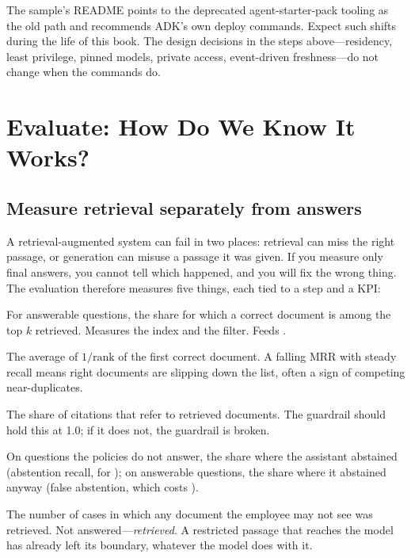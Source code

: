 \begin{designnote}
The sample's README points to the deprecated agent-starter-pack tooling as the old path and recommends ADK's own deploy commands. Expect such shifts during the life of this book. The design decisions in the steps above---residency, least privilege, pinned models, private access, event-driven freshness---do not change when the commands do.
\end{designnote}

\section{Evaluate: How Do We Know It Works?}
\label{sec:policy-evaluate}

\subsection{Measure retrieval separately from answers}

A retrieval-augmented system can fail in two places: retrieval can miss the right passage, or generation can misuse a passage it was given. If you measure only final answers, you cannot tell which happened, and you will fix the wrong thing. The evaluation therefore measures five things, each tied to a step and a KPI:
\begin{description}[leftmargin=1em,itemsep=2pt]
  \item[Recall@$k$] For answerable questions, the share for which a correct document is among the top $k$ retrieved. Measures the index and the filter. Feeds .
  \item[Mean reciprocal rank (MRR)] The average of $1/\text{rank}$ of the first correct document. A falling MRR with steady recall means right documents are slipping down the list, often a sign of competing near-duplicates.
  \item[Citation precision] The share of citations that refer to retrieved documents. The guardrail should hold this at 1.0; if it does not, the guardrail is broken.
  \item[Abstention] On questions the policies do not answer, the share where the assistant abstained (abstention recall, for ); on answerable questions, the share where it abstained anyway (false abstention, which costs ).
  \item[Leakage] The number of cases in which any document the employee may not see was retrieved. Not answered---\emph{retrieved}. A restricted passage that reaches the model has already left its boundary, whatever the model does with it.
\end{description}

